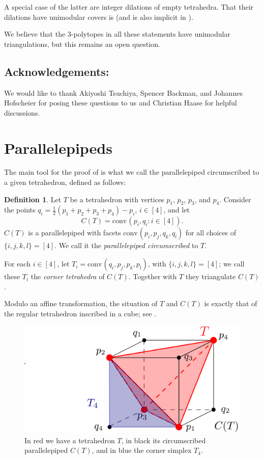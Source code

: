 \documentclass{amsart}
\theoremstyle{plain}
\theoremstyle{definition}
\newtheorem{definition}[theorem]{Definition}
\newcommand{\conv}{\ensuremath{\mathrm{conv}}\hspace{1pt}}
\begin{document}
A special case of the latter are integer dilations of empty tetrahedra. That their dilations have
unimodular covers is \cite[Cor.~4.2]{SantosZiegler} (and is also implicit in \cite{KantorSarkaria}).

\medskip
We believe that the $3$-polytopes in all these statements have unimodular triangulations, but this remains an open question.


\subsection*{Acknowledgements:} We would like to thank Akiyoshi Tsuchiya, Spencer Backman, and Johannes Hofscheier for posing these questions to us and 
Christian Haase for helpful discussions.


\section{Parallelepipeds}
\label{sec:parallelepipeds}

The main tool for the proof of  is what we call the parallelepiped circumscribed to a given tetrahedron, defined as follows:

\begin{definition}
\label{def:circunpara}
Let $T$ be a tetrahedron with vertices $p_1$, $p_2$, $p_3$, and $p_4$. Consider the points $q_i= \frac12 (p_1+p_2+p_3+p_4) - p_i$, $i\in [4]$, and let
\[
C(T)=\conv(p_i,q_i: i\in[4]).
\] 
$C(T)$ is a parallelepiped with facets $\conv(p_i, p_j, q_k, q_l)$ for all choices of $\{i,j,k,l\}=[4]$. We call it the \emph{parallelepiped circumscribed} to $T$.

For each $i \in [4]$, let $T_i=\conv(q_i, p_j, p_k, p_l)$, with $\{i,j,k,l\}=[4]$; we call these $T_i$ the \emph{corner tetrahedra} of $C(T)$. Together with $T$ they triangulate $C(T)$.
\end{definition}

Modulo an affine transformation, the situation of $T$ and $C(T)$ is exactly that of the regular tetrahedron inscribed in a cube; see . 
%
\begin{figure}[htb]
\includegraphics[scale=.25]{circumscribed_parall}
\caption{In red we have a tetrahedron $T$, in black its circumscribed parallelepiped $C(T)$, and in blue the corner simplex $T_4$.}
\label{fig:circumscribed_parall}
\end{figure}
\end{document}
